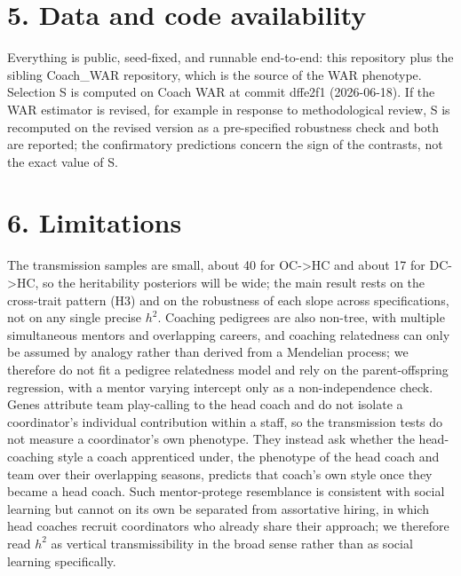 \documentclass[11pt]{article}
\begin{document}
\section*{5. Data and code availability}

Everything is public, seed-fixed, and runnable end-to-end: this repository plus the sibling Coach\_WAR repository, which is the source of the WAR phenotype. Selection S is computed on Coach WAR at commit dffe2f1 (2026-06-18). If the WAR estimator is revised, for example in response to methodological review, S is recomputed on the revised version as a pre-specified robustness check and both are reported; the confirmatory predictions concern the sign of the contrasts, not the exact value of S.

\section*{6. Limitations}

The transmission samples are small, about 40 for OC-\textgreater{}HC and about 17 for DC-\textgreater{}HC, so the heritability posteriors will be wide; the main result rests on the cross-trait pattern (H3) and on the robustness of each slope across specifications, not on any single precise $h^{2}$. Coaching pedigrees are also non-tree, with multiple simultaneous mentors and overlapping careers, and coaching relatedness can only be assumed by analogy rather than derived from a Mendelian process; we therefore do not fit a pedigree relatedness model and rely on the parent-offspring regression, with a mentor varying intercept only as a non-independence check. Genes attribute team play-calling to the head coach and do not isolate a coordinator's individual contribution within a staff, so the transmission tests do not measure a coordinator's own phenotype. They instead ask whether the head-coaching style a coach apprenticed under, the phenotype of the head coach and team over their overlapping seasons, predicts that coach's own style once they became a head coach. Such mentor-protege resemblance is consistent with social learning but cannot on its own be separated from assortative hiring, in which head coaches recruit coordinators who already share their approach; we therefore read $h^{2}$ as vertical transmissibility in the broad sense rather than as social learning specifically.
\end{document}
